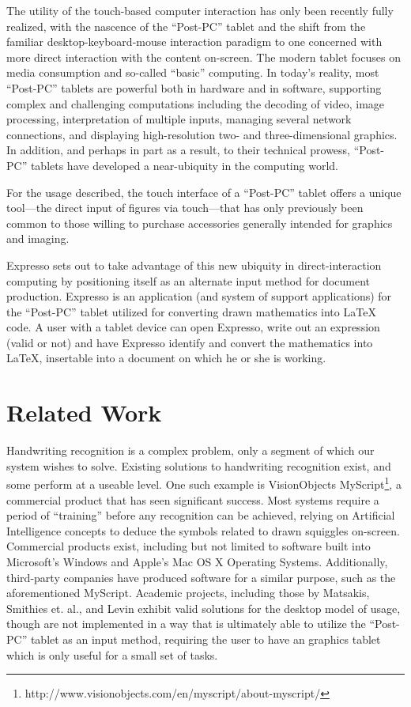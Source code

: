 \documentclass{acm_proc_article-sp}
\begin{document}
The utility of the touch-based computer interaction has only been recently fully realized, with the nascence of the ``Post-PC'' tablet and the shift from the familiar desktop-keyboard-mouse interaction paradigm to one concerned with more direct interaction with the content on-screen. The modern tablet focuses on media consumption and so-called ``basic'' computing. In today's reality, most ``Post-PC'' tablets are powerful both in hardware and in software, supporting complex and challenging computations including the decoding of video, image processing, interpretation of multiple inputs, managing several network connections, and displaying high-resolution two- and three-dimensional graphics. In addition, and perhaps in part as a result, to their technical prowess, ``Post-PC'' tablets have developed a near-ubiquity in the computing world.

For the usage described, the touch interface of a ``Post-PC'' tablet offers a unique tool---the direct input of figures via touch---that has only previously been common to those willing to purchase accessories generally intended for graphics and imaging.

Expresso sets out to take advantage of this new ubiquity in direct-interaction computing by positioning itself as an alternate input method for document production. Expresso is an application (and system of support applications) for the ``Post-PC'' tablet utilized for converting drawn mathematics into \LaTeX{} code. A user with a tablet device can open Expresso, write out an expression (valid or not) and have Expresso identify and convert the mathematics into \LaTeX{}, insertable into a document on which he or she is working.

\section{Related Work}
Handwriting recognition is a complex problem, only a segment of which our system wishes to solve. Existing solutions to handwriting recognition exist, and some perform at a useable level. One such example is VisionObjects MyScript\footnote{http://www.visionobjects.com/en/myscript/about-myscript/}, a commercial product that has seen significant success. Most systems require a period of ``training'' before any recognition can be achieved, relying on Artificial Intelligence concepts to deduce the symbols related to drawn squiggles on-screen. Commercial products exist, including but not limited to software built into Microsoft's Windows and Apple's Mac OS X Operating Systems. Additionally, third-party companies have produced software for a similar purpose, such as the aforementioned MyScript. Academic projects, including those by Matsakis\cite{matsakis_recognition_1999}, Smithies et. al.\cite{smithies_handwriting-based_1999}, and Levin\cite{levin_cellwriter:_2007} exhibit valid solutions for the desktop model of usage, though are not implemented in a way that is ultimately able to utilize the ``Post-PC'' tablet as an input method, requiring the user to have an graphics tablet which is only useful for a small set of tasks. 
\end{document}
